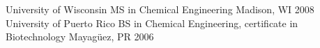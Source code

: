 


\begin{cvhonors}
	\cvhonor
		{University of Wisconsin} %
		{MS in Chemical Engineering}
		{Madison, WI}
		{2008}
	\cvhonor
		{University of Puerto Rico} %
		{BS in Chemical Engineering, certificate in Biotechnology}
		{Mayagüez, PR}
		{2006}
\end{cvhonors}

%
%
%
